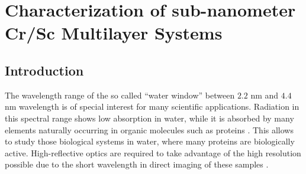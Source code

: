 \chapter{Characterization of sub-nanometer Cr/Sc Multilayer Systems}

\section{Introduction}

The wavelength range of the so called ``water window'' between $2.2$ nm and $4.4$ nm wavelength is of special interest for many scientific applications. Radiation in this spectral range shows low absorption in water, while it is absorbed by many elements naturally occurring in organic molecules such as proteins \cite{WaterWindowBioRelevance}. This allows to study those biological systems in water, where many proteins are biologically active. High-reflective optics are required to take advantage of the high resolution possible due to the short wavelength in direct imaging of these samples \cite{waterwindow_mirrors_1,Legall:12}.

